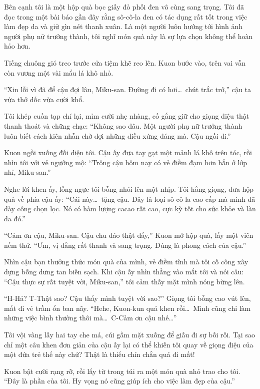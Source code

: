 \documentclass[../main.tex]{subfiles}
\begin{document}
Bên cạnh tôi là một hộp quà bọc giấy đỏ phối đen vô cùng sang trọng. Tôi đã đọc trong một bài báo gần đây rằng sô-cô-la đen có tác dụng rất tốt trong việc làm đẹp da và giữ gìn nét thanh xuân. Là một người luôn hướng tới hình ảnh người phụ nữ trưởng thành, tôi nghĩ món quà này là sự lựa chọn không thể hoàn hảo hơn.

Tiếng chuông gió treo trước cửa tiệm khẽ reo lên. Kuon bước vào, trên vai vẫn còn vương một vài mẩu lá khô nhỏ.

``Xin lỗi vì đã để cậu đợi lâu, Miku-san. Đường đi có hơi\dots\ chút trắc trở,'' cậu ta vừa thở dốc vừa cười khổ.

Tôi khép cuốn tạp chí lại, mỉm cười nhẹ nhàng, cố gắng giữ cho giọng điệu thật thanh thoát và chững chạc: ``Không sao đâu. Một người phụ nữ trưởng thành luôn biết cách kiên nhẫn chờ đợi những điều xứng đáng mà. Cậu ngồi đi.''

Kuon ngồi xuống đối diện tôi. Cậu ấy đưa tay gạt một mảnh lá khô trên tóc, rồi nhìn tôi với vẻ ngưỡng mộ: ``Trông cậu hôm nay có vẻ điềm đạm hơn hẳn ở lớp nhỉ, Miku-san.''

Nghe lời khen ấy, lồng ngực tôi bỗng nhói lên một nhịp. Tôi hắng giọng, đưa hộp quà về phía cậu ấy: ``Cái này\dots\ tặng cậu. Đây là loại sô-cô-la cao cấp mà mình đã dày công chọn lọc. Nó có hàm lượng cacao rất cao, cực kỳ tốt cho sức khỏe và làn da đó.''

``Cảm ơn cậu, Miku-san. Cậu chu đáo thật đấy,'' Kuon mở hộp quà, lấy một viên nếm thử. ``Ưm, vị đắng rất thanh và sang trọng. Đúng là phong cách của cậu.''

Nhìn cậu bạn thưởng thức món quà của mình, vẻ điềm tĩnh mà tôi cố công xây dựng bỗng dưng tan biến sạch. Khi cậu ấy nhìn thẳng vào mắt tôi và nói câu: ``Cậu thực sự rất tuyệt vời, Miku-san,'' tôi cảm thấy mặt mình nóng bừng lên.

``H-Hả? T-Thật sao? Cậu thấy mình tuyệt vời sao?'' Giọng tôi bỗng cao vút lên, mất đi vẻ trầm ổn ban nãy. ``Hehe, Kuon-kun quá khen rồi\dots\ Mình cũng chỉ làm những việc bình thường thôi mà\dots\ C-Cảm ơn cậu nhé\dots''

Tôi vội vàng lấy hai tay che má, cúi gầm mặt xuống để giấu đi sự bối rối. Tại sao chỉ một câu khen đơn giản của cậu ấy lại có thể khiến tôi quay về giọng điệu của một đứa trẻ thế này chứ? Thật là thiếu chín chắn quá đi mất!

Kuon bật cười rạng rỡ, rồi lấy từ trong túi ra một món quà nhỏ trao cho tôi. ``Đây là phần của tôi. Hy vọng nó cũng giúp ích cho việc làm đẹp của cậu.''
\end{document}
